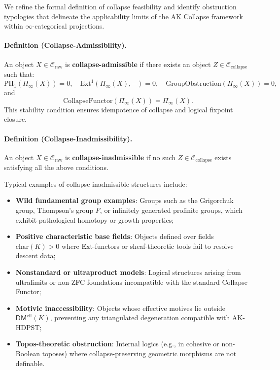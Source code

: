 \documentclass[11pt]{article}
\begin{document}
We refine the formal definition of collapse feasibility and identify obstruction typologies that delineate the applicability limits of the AK Collapse framework within $\infty$-categorical projections.

\paragraph{Definition (Collapse-Admissibility).}

An object \( X \in \mathcal{C}_{\mathrm{raw}} \) is \textbf{collapse-admissible} if there exists an object \( Z \in \mathcal{C}_{\mathrm{collapse}} \) such that:
\[
\mathrm{PH}_1(\Pi_\infty(X)) = 0, \quad
\mathrm{Ext}^1(\Pi_\infty(X), -) = 0, \quad
\mathrm{GroupObstruction}(\Pi_\infty(X)) = 0,
\]
and
\[
\mathrm{CollapseFunctor}(\Pi_\infty(X)) = \Pi_\infty(X).
\]
This stability condition ensures idempotence of collapse and logical fixpoint closure.

\paragraph{Definition (Collapse-Inadmissibility).}

An object \( X \in \mathcal{C}_{\mathrm{raw}} \) is \textbf{collapse-inadmissible} if no such \( Z \in \mathcal{C}_{\mathrm{collapse}} \) exists satisfying all the above conditions.

Typical examples of collapse-inadmissible structures include:

\begin{itemize}
  \item \textbf{Wild fundamental group examples}: Groups such as the Grigorchuk group, Thompson’s group \( F \), or infinitely generated profinite groups, which exhibit pathological homotopy or growth properties;
  \item \textbf{Positive characteristic base fields}: Objects defined over fields \( \mathrm{char}(K) > 0 \) where Ext-functors or sheaf-theoretic tools fail to resolve descent data;
  \item \textbf{Nonstandard or ultraproduct models}: Logical structures arising from ultralimits or non-ZFC foundations incompatible with the standard Collapse Functor;
  \item \textbf{Motivic inaccessibility}: Objects whose effective motives lie outside \( \mathsf{DM}^{\mathrm{eff}}(K) \), preventing any triangulated degeneration compatible with AK-HDPST;
  \item \textbf{Topos-theoretic obstruction}: Internal logics (e.g., in cohesive or non-Boolean toposes) where collapse-preserving geometric morphisms are not definable.
\end{itemize}
\end{document}
